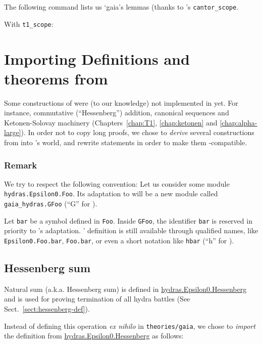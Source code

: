The following command lists us `gaia's lemmas (thanks to
\gaia's  \texttt{cantor\_scope}.

With \texttt{t1\_scope}:

\section{Importing Definitions and theorems from \HydrasLib}

Some constructions of \HydrasLib were (to our knowledge) not implemented in \gaia yet. For instance, commutative (``Hessenberg'') addition, canonical sequences and Ketonen-Solovay machinery (Chapters~\ref{chap:T1}, \ref{chap:ketonen} and \ref{chap:alpha-large}). In order not to copy long proofs, we chose to
\emph{derive} several constructions from \HydrasLib into \gaia's world, and rewrite \HydrasLib statements in order to make them \gaia-compatible.


\subsubsection{Remark}
\label{sect:gaia-masking}
We try to respect the following convention:
Let us consider  some module \texttt{hydras.Epsilon0.Foo}.
Its adaptation to \gaia will be a new module called \linebreak
\texttt{gaia\_hydras.GFoo} (``G'' for \gaia).

Let \texttt{bar} be a symbol defined in \texttt{Foo}.
Inside \texttt{GFoo}, the identifier \texttt{bar}
  is reserved in priority to \gaia's adaptation.
  \HydrasLib' definition is still available through qualified names, like \texttt{Epsilon0.Foo.bar}, \texttt{Foo.bar}, or even a short notation like \texttt{hbar}  (``h'' for \HydrasLib).

  
\subsection{Hessenberg sum}
Natural sum  (a.k.a. Hessenberg  sum) is defined in
\href{../theories/html/hydras.Epsilon0.Hessenberg.html}{hydras.Epsilon0.Hessenberg} and is used for proving termination of all hydra battles (See Sect.~\ref{sect:hessenberg-def}).

Instead of defining this operation \emph{ex nihilo} in \texttt{theories/gaia}, we chose to \emph{import} the definition
from \href{../theories/html/hydras.Epsilon0.Hessenberg.html}{hydras.Epsilon0.Hessenberg} as follows:

